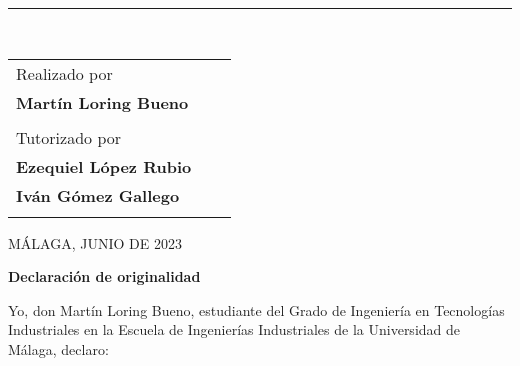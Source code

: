 \documentclass{report}
\begin{document}
\begin{titlepage}
\begin{center}
    \rule{\linewidth}{0.2 mm} \\[1 cm]
    \vspace{-0.5cm}


\vspace*{1cm}	


\begin{table}[H]
\centering
\begin{large}

\begin{tabular}{lll}

Realizado por
                \\

\textbf{Martín Loring Bueno}      \\

\\

Tutorizado por
                \\

\textbf{Ezequiel López Rubio} \\


\textbf{Iván Gómez Gallego}     \\

\\



\end{tabular}
\end{large}
\end{table}

\vspace*{0.1cm}

\begin{large}
MÁLAGA, JUNIO DE 2023 
\end{large}
\end{center}

\end{titlepage}
			
			
			





\setcounter{tocdepth}{4}
\setcounter{page}{1}		


\thispagestyle{empty}
\begin{center}
    {\huge  \textbf{Declaración de originalidad} \par}
\end{center}

Yo, don Martín Loring Bueno, estudiante del Grado de Ingeniería en Tecnologías Industriales en la Escuela de Ingenierías Industriales de la Universidad de Málaga, declaro:
\end{document}
